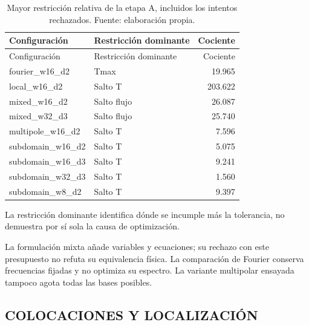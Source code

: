 \begingroup\footnotesize\setlength{\tabcolsep}{3pt}
\begin{longtable}{L{5.2cm}L{4cm}r}
\caption{Mayor restricción relativa de la etapa A, incluidos los intentos rechazados. Fuente: elaboración propia.}\label{tab:explicit-A-diagnosis}\\
\toprule
Configuración & Restricción dominante & Cociente\\
\midrule\endfirsthead
\toprule
Configuración & Restricción dominante & Cociente\\
\midrule\endhead
fourier\_w16\_d2 & Tmax & 19.965\\
local\_w16\_d2 & Salto T & 203.622\\
mixed\_w16\_d2 & Salto flujo & 26.087\\
mixed\_w32\_d3 & Salto flujo & 25.740\\
multipole\_w16\_d2 & Salto T & 7.596\\
subdomain\_w16\_d2 & Salto T & 5.075\\
subdomain\_w16\_d3 & Salto T & 9.241\\
subdomain\_w32\_d3 & Salto T & 1.560\\
subdomain\_w8\_d2 & Salto T & 9.397\\
\bottomrule\end{longtable}\endgroup

La restricción dominante identifica dónde se incumple más la tolerancia, no demuestra por sí sola la causa de optimización.

La formulación mixta añade variables y ecuaciones; su rechazo con este presupuesto no refuta su equivalencia física. La comparación de Fourier conserva frecuencias fijadas y no optimiza su espectro. La variante multipolar ensayada tampoco agota todas las bases posibles.

\subsection{COLOCACIONES Y LOCALIZACIÓN}

